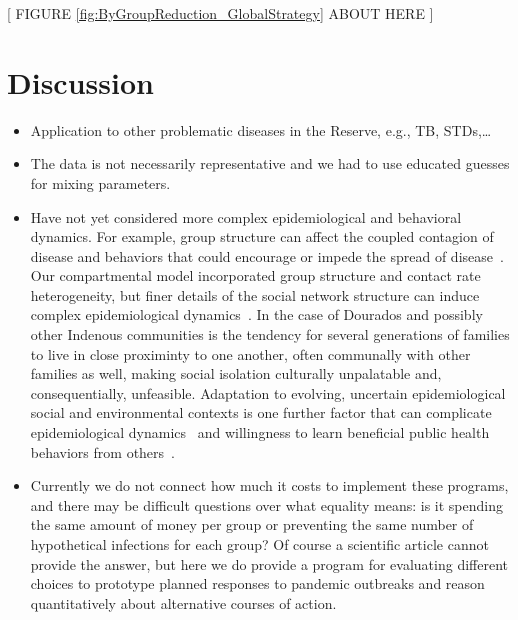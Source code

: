\documentclass[
  letterpaper,
  abstract]{scrartcl}
\begin{document}
\vspace{0.5em}
\begin{center}
{[ FIGURE \ref{fig:ByGroupReduction_GlobalStrategy} ABOUT HERE ]} \\
\end{center}


\section{Discussion}\label{discussion}


\begin{itemize}
  \item 
    Application to other problematic diseases in the Reserve, e.g., TB, STDs,\ldots 
  \item
    The data is not necessarily representative and we had to use educated guesses
    for mixing parameters.
  \item
    Have not yet considered more complex epidemiological and behavioral
    dynamics. For example, group structure can affect the coupled contagion of
    disease and behaviors that could encourage or impede the spread of
    disease~\autocite{SmaldinoJones2021}. Our compartmental model
    incorporated group structure and contact rate heterogeneity, but finer
    details of the social network structure can induce complex
    epidemiological dynamics~\autocite{Arthur2017}. In the case of Dourados
    and possibly other Indenous communities is the tendency for several
    generations of families to live in close proximinty to one another,
    often communally with other families as well, making social isolation
    culturally unpalatable and, consequentially, unfeasible. Adaptation to
    evolving, uncertain epidemiological social and environmental contexts is
    one further factor that can complicate epidemiological
    dynamics~\autocite{Arthur2021} and willingness to learn beneficial public
    health behaviors from others~\autocite{Turner2023a}.
  \item
    Currently we do not connect how much it costs to implement these programs,
    and there may be difficult questions over what equality means: is it
    spending the same amount of money per group or preventing the same number of
    hypothetical infections for each group? Of course a scientific article 
    cannot provide the answer, but here we do provide a program for evaluating
    different choices to prototype planned responses to pandemic outbreaks and
    reason quantitatively about alternative courses of action.
\end{itemize}
\end{document}
